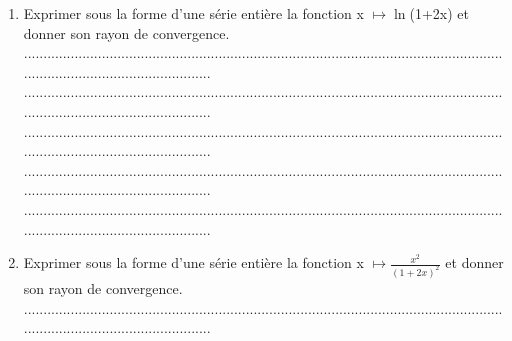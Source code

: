 \documentclass{article}
\begin{document}
\begin{footnotesize}
\begin{enumerate}
    ...........................................................................................................................................................................\newline
    ...........................................................................................................................................................................\newline
    ...........................................................................................................................................................................\newline\newline
    \item Exprimer sous la forme d'une série entière la fonction x $\mapsto \ln$(1+2x) et donner son rayon de convergence.\newline\newline
    ...........................................................................................................................................................................\newline
    ...........................................................................................................................................................................\newline
    ...........................................................................................................................................................................\newline
    ...........................................................................................................................................................................\newline
    ...........................................................................................................................................................................\newline\newline
    \item Exprimer sous la forme d'une série entière la fonction x $\mapsto \frac{x^{2}}{(1+2x)^{2}}$ et donner son rayon de convergence.\newline\newline
    ...........................................................................................................................................................................\newline

\end{enumerate}
\end{footnotesize}
\end{document}
